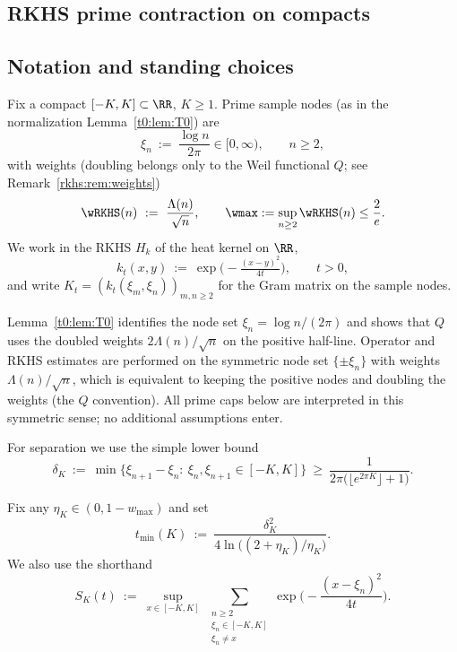 \subsection{RKHS prime contraction on compacts}\label{sec:rkhs-prime-cap}\label{sec:prime-cap}

\subsection*{Notation and standing choices}
Fix a compact $[-K,K]\subset\RR$, $K\ge1$. Prime sample nodes (as in the normalization Lemma~\ref{t0:lem:T0}) are
\[
\xi_n \ :=\ \frac{\log n}{2\pi}\in[0,\infty),\qquad n\ge2,
\]
with weights (doubling belongs only to the Weil functional $Q$; see Remark~\ref{rkhs:rem:weights})
\[
\wRKHS(n)\ :=\ \frac{\Lambda(n)}{\sqrt{n}},\qquad \wmax:=\sup_{n\ge2}\wRKHS(n)\le \frac{2}{e}.
\]
We work in the RKHS $H_k$ of the heat kernel on $\RR$,
\[
k_t(x,y)\ :=\ \exp\!\big(-\tfrac{(x-y)^2}{4t}\big),\qquad t>0,
\]
and write $K_t=(k_t(\xi_m,\xi_n))_{m,n\ge2}$ for the Gram matrix on the sample nodes.


\begin{remark}\label{rkhs:rem:weights}
Lemma~\ref{t0:lem:T0} identifies the node set $\xi_n=\log n/(2\pi)$ and shows that $Q$ uses the doubled
weights $2\Lambda(n)/\sqrt n$ on the positive half-line. Operator and RKHS estimates are performed on the
symmetric node set $\{\pm\xi_n\}$ with weights $\Lambda(n)/\sqrt n$, which is equivalent to keeping the
positive nodes and doubling the weights (the $Q$ convention). All prime caps below are interpreted in this symmetric sense; no additional assumptions enter.
\end{remark}
For separation we use the simple lower bound
\begin{equation}\label{eq:deltaK}
\delta_K\ :=\ \min\!\Big\{\xi_{n+1}-\xi_n:\ \xi_n,\xi_{n+1}\in[-K,K]\Big\}
\ \ge\ \frac{1}{2\pi\big(\lfloor e^{2\pi K}\rfloor+1\big)}.
\end{equation}

\begin{remark}\label{rem:params}
Fix any $\eta_K\in(0,1-w_{\max})$ and set
\begin{equation}\label{eq:tmin}
t_{\min}(K)\ :=\ \frac{\delta_K^2}{4\ln\!\big((2+\eta_K)/\eta_K\big)}.
\end{equation}
We also use the shorthand
\[
S_K(t)\ :=\ \sup_{x\in[-K,K]}\ \sum_{\substack{n\ge2\\ \xi_n\in[-K,K] \\ \xi_n\neq x}}
\exp\!\Big(-\frac{(x-\xi_n)^2}{4t}\Big).
\]
\end{remark}

